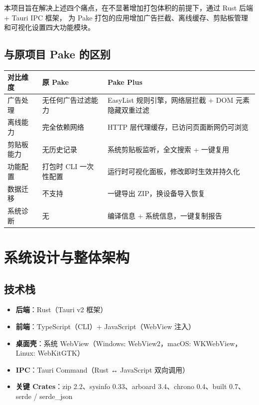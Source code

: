 \documentclass[12pt,a4paper]{ctexart}
\begin{document}
本项目旨在解决上述四个痛点，在不显著增加打包体积的前提下，通过 Rust 后端 + Tauri IPC 框架，
为 Pake 打包的应用增加广告拦截、离线缓存、剪贴板管理和可视化设置四大功能模块。

\subsection{与原项目 Pake 的区别}

\begin{table}[h]
\centering
\small
\begin{tabularx}{\textwidth}{lXX}
\toprule
对比维度 & 原 Pake & Pake Plus \\
\midrule
广告处理   & 无任何广告过滤能力 & EasyList 规则引擎，网络层拦截 + DOM 元素隐藏双重过滤 \\
离线能力   & 完全依赖网络 & HTTP 层代理缓存，已访问页面断网仍可浏览 \\
剪贴板能力 & 无历史记录 & 系统剪贴板监听，全文搜索 + 一键复用 \\
功能配置   & 打包时 CLI 一次性配置 & 运行时可视化面板，修改即时生效并持久化 \\
数据迁移   & 不支持 & 一键导出 ZIP，换设备导入恢复 \\
系统诊断   & 无 & 编译信息 + 系统信息，一键复制报告 \\
\bottomrule
\end{tabularx}
\end{table}

\section{系统设计与整体架构}

\subsection{技术栈}

\begin{itemize}
  \item \textbf{后端}：Rust（Tauri v2 框架）
  \item \textbf{前端}：TypeScript（CLI）+ JavaScript（WebView 注入）
  \item \textbf{桌面壳}：系统 WebView（Windows: WebView2，macOS: WKWebView，Linux: WebKitGTK）
  \item \textbf{IPC}：Tauri Command（Rust ↔ JavaScript 双向调用）
  \item \textbf{关键 Crates}：zip 2.2、sysinfo 0.33、arboard 3.4、chrono 0.4、built 0.7、serde / serde\_json
\end{itemize}
\end{document}
